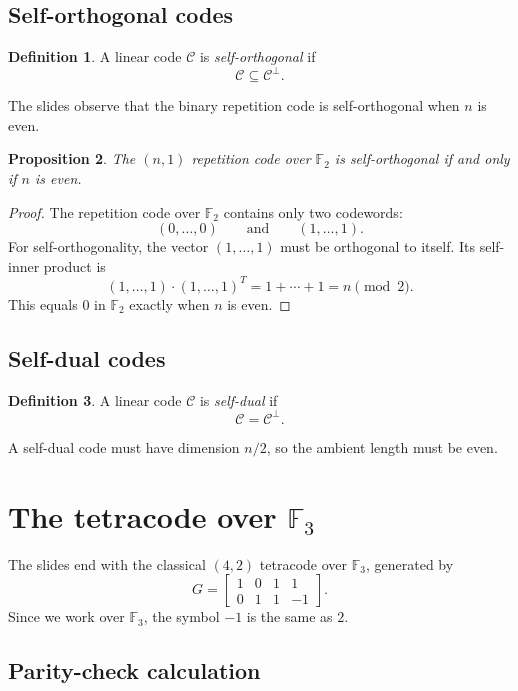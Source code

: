 \documentclass[11pt]{article}
\newtheorem{proposition}{Proposition}[section]
\theoremstyle{definition}
\newtheorem{definition}[proposition]{Definition}
\theoremstyle{remark}
\newcommand{\F}{\mathbb{F}}
\newcommand{\code}{\mathcal{C}}
\newcommand{\dual}[1]{#1^{\perp}}
\begin{document}
\subsection{Self-orthogonal codes}

\begin{definition}
A linear code $\code$ is \emph{self-orthogonal} if
\[
\code\subseteq \dual{\code}.
\]
\end{definition}

The slides observe that the binary repetition code is self-orthogonal when $n$ is even.

\begin{proposition}
The $(n,1)$ repetition code over $\F_2$ is self-orthogonal if and only if $n$ is even.
\end{proposition}

\begin{proof}
The repetition code over $\F_2$ contains only two codewords:
\[
(0,\dots,0)\qquad \text{and}\qquad (1,\dots,1).
\]
For self-orthogonality, the vector $(1,\dots,1)$ must be orthogonal to itself. Its self-inner product is
\[
(1,\dots,1)\cdot(1,\dots,1)^T=1+\cdots+1=n\pmod 2.
\]
This equals $0$ in $\F_2$ exactly when $n$ is even.
\end{proof}

\subsection{Self-dual codes}

\begin{definition}
A linear code $\code$ is \emph{self-dual} if
\[
\code=\dual{\code}.
\]
\end{definition}

A self-dual code must have dimension $n/2$, so the ambient length must be even.

\section{The tetracode over $\F_3$}

The slides end with the classical $(4,2)$ tetracode over $\F_3$, generated by
\[
G=
\begin{bmatrix}
1&0&1&1\\
0&1&1&-1
\end{bmatrix}.
\]
Since we work over $\F_3$, the symbol $-1$ is the same as $2$.

\subsection{Parity-check calculation}
\end{document}
